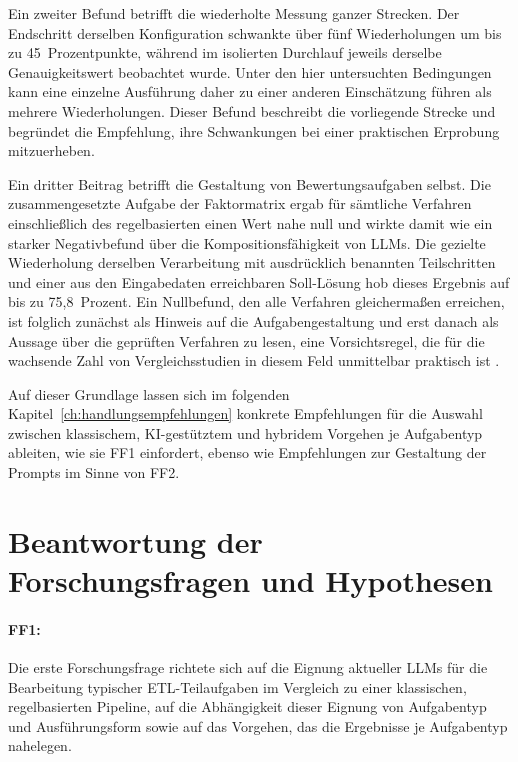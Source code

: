Ein zweiter Befund betrifft die wiederholte Messung ganzer Strecken. Der Endschritt derselben Konfiguration schwankte über fünf Wiederholungen um bis zu 45~Prozentpunkte, während im isolierten Durchlauf jeweils derselbe Genauigkeitswert beobachtet wurde. Unter den hier untersuchten Bedingungen kann eine einzelne Ausführung daher zu einer anderen Einschätzung führen als mehrere Wiederholungen. Dieser Befund beschreibt die vorliegende Strecke und begründet die Empfehlung, ihre Schwankungen bei einer praktischen Erprobung mitzuerheben.

Ein dritter Beitrag betrifft die Gestaltung von Bewertungsaufgaben selbst. Die zusammengesetzte Aufgabe der Faktormatrix ergab für sämtliche Verfahren einschließlich des regelbasierten einen Wert nahe null und wirkte damit wie ein starker Negativbefund über die Kompositionsfähigkeit von \acp{LLM}. Die gezielte Wiederholung derselben Verarbeitung mit ausdrücklich benannten Teilschritten und einer aus den Eingabedaten erreichbaren Soll-Lösung hob dieses Ergebnis auf bis zu 75,8~Prozent. Ein Nullbefund, den alle Verfahren gleichermaßen erreichen, ist folglich zunächst als Hinweis auf die Aufgabengestaltung und erst danach als Aussage über die geprüften Verfahren zu lesen, eine Vorsichtsregel, die für die wachsende Zahl von Vergleichsstudien in diesem Feld unmittelbar praktisch ist \autocite{mumuniAutomatedDataProcessing2025}.

Auf dieser Grundlage lassen sich im folgenden Kapitel~\ref{ch:handlungsempfehlungen} konkrete Empfehlungen für die Auswahl zwischen klassischem, \ac{KI}-gestütztem und hybridem Vorgehen je Aufgabentyp ableiten, wie sie FF1 einfordert, ebenso wie Empfehlungen zur Gestaltung der Prompts im Sinne von FF2.

\section{Beantwortung der Forschungsfragen und Hypothesen}
\label{sec:beantwortung-ff}

\paragraph{FF1:} Die erste Forschungsfrage richtete sich auf die Eignung aktueller \acp{LLM} für die Bearbeitung typischer \ac{ETL}-Teilaufgaben im Vergleich zu einer klassischen, regelbasierten Pipeline, auf die Abhängigkeit dieser Eignung von Aufgabentyp und Ausführungsform sowie auf das Vorgehen, das die Ergebnisse je Aufgabentyp nahelegen.

